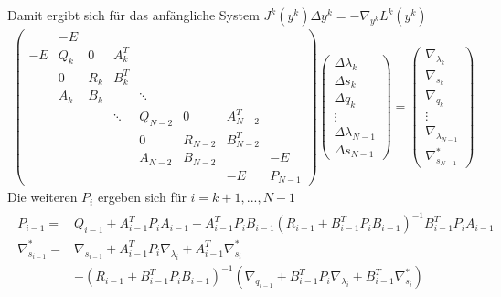 \documentclass[12pt,a4paper]{article}
\begin{document}
  Damit ergibt sich für das anfängliche System $ J^{k}(y^{k})\Delta y^{k} = -\nabla_{y^{k}} L^{k}(y^{k})$
  \begin{align*}
  \begin{pmatrix}
    & -E &   &   &   &   &   &      \\
  -E& Q_k & 0  &  A_k^{T} &  &   &    &       \\
    & 0   & R_k & B_k^{T} &  &   &   &      \\
    & A_k & B_k &     & \ddots &   &   &    \\
    &  &  & \ddots & Q_{N-2} & 0 & A_{N-2}^{T}  &     \\
    &  &  &        &  0      & R_{N-2}  & B_{N-2}^{T}  &     \\
    &  &  &        & A_{N-2} & B_{N-2}  &     & -E \\
    &  &  &  &  &  & -E & P_{N-1}
  \end{pmatrix}
  \begin{pmatrix}
  \Delta \lambda_{k} \\
  \Delta s_{k} \\
  \Delta q_{k} \\
  \vdots \\
  \Delta \lambda_{N-1} \\
  \Delta s_{N-1} 
  \end{pmatrix} =
  \begin{pmatrix}
  \nabla_{\lambda_{k}} \\
  \nabla_{s_{k}} \\ 
  \nabla_{q_{k}} \\
  \vdots \\
  \nabla_{\lambda_{N-1}} \\
  \nabla_{s_{N-1}}^{*}
  \end{pmatrix}
  \end{align*}
  Die weiteren $P_i $ ergeben sich für $ i = k+1, ..., N-1$
  \begin{align*}
  \begin{array}{rl}
  P_{i-1} = & Q_{i-1}+A_{i-1}^{T}P_i A_{i-1} -A_{i-1}^{T}P_i B_{i-1}
  (R_{i-1}+B_{i-1}^{T}P_i B_{i-1})^{-1} B_{i-1}^{T}P_i A_{i-1} \\
  \nabla_{s_{i-1}}^{*} = & \nabla_{s_{i-1}} + A_{i-1}^{T}P_i \nabla_{\lambda_{i}} + A_{i-1}^{T}\nabla_{s_{i}}^{*} \\
   & - (R_{i-1}+B_{i-1}^{T}P_i B_{i-1})^{-1}(\nabla_{q_{i-1}} +B_{i-1}^{T}P_i \nabla_{\lambda_{i}} +B_{i-1}^{T}\nabla_{s_{i}}^{*})
  \end{array}
  \end{align*}
\end{document}
